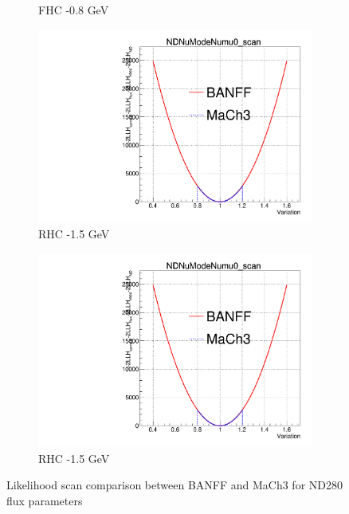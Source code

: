 \begin{figure}[h]
\begin{subfigure}[t]{0.24\textwidth}
		\caption{FHC -0.8 GeV}
	\end{subfigure}
\begin{subfigure}[t]{0.24\textwidth}
\includegraphics[width=\textwidth, trim={0mm 0mm 0mm 11mm}, clip,page=36]{figures/mach3/banff/Asimov_scan_20July_flux_Full_LLHscan_18July_BeRPA_U_ND280logL_scan}
		\caption{RHC -1.5 GeV}
\end{subfigure}
\begin{subfigure}[t]{0.24\textwidth}
\includegraphics[width=\textwidth, trim={0mm 0mm 0mm 11mm}, clip,page=47]{figures/mach3/banff/Asimov_scan_20July_flux_Full_LLHscan_18July_BeRPA_U_ND280logL_scan}
		\caption{RHC -1.5 GeV}
\end{subfigure}
\caption{Likelihood scan comparison between BANFF and MaCh3 for ND280 flux parameters}
\label{fig:banff_asimov_scan_ND280_flux}
\end{figure}

